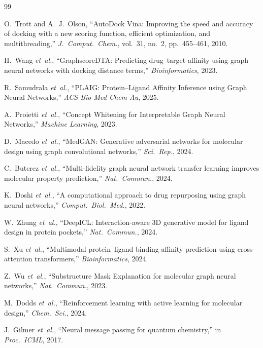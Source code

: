 \documentclass[conference]{IEEEtran}
\begin{document}
\begin{thebibliography}{99}

O.~Trott and A.~J.~Olson,
``AutoDock Vina: Improving the speed and accuracy of docking with a new scoring function, efficient optimization, and multithreading,''
\emph{J.\ Comput.\ Chem.}, vol.~31, no.~2, pp.~455--461, 2010.

H.~Wang \emph{et~al.},
``GraphscoreDTA: Predicting drug--target affinity using graph neural networks with docking distance terms,''
\emph{Bioinformatics}, 2023.

R.~Samudrala \emph{et~al.},
``PLAIG: Protein--Ligand Affinity Inference using Graph Neural Networks,''
\emph{ACS Bio Med Chem Au}, 2025.

A.~Proietti \emph{et~al.},
``Concept Whitening for Interpretable Graph Neural Networks,''
\emph{Machine Learning}, 2023.

D.~Macedo \emph{et~al.},
``MedGAN: Generative adversarial networks for molecular design using graph convolutional networks,''
\emph{Sci.\ Rep.}, 2024.

C.~Buterez \emph{et~al.},
``Multi-fidelity graph neural network transfer learning improves molecular property prediction,''
\emph{Nat.\ Commun.}, 2024.

K.~Doshi \emph{et~al.},
``A computational approach to drug repurposing using graph neural networks,''
\emph{Comput.\ Biol.\ Med.}, 2022.

W.~Zhung \emph{et~al.},
``DeepICL: Interaction-aware 3D generative model for ligand design in protein pockets,''
\emph{Nat.\ Commun.}, 2024.

S.~Xu \emph{et~al.},
``Multimodal protein--ligand binding affinity prediction using cross-attention transformers,''
\emph{Bioinformatics}, 2024.

Z.~Wu \emph{et~al.},
``Substructure Mask Explanation for molecular graph neural networks,''
\emph{Nat.\ Commun.}, 2023.

M.~Dodds \emph{et~al.},
``Reinforcement learning with active learning for molecular design,''
\emph{Chem.\ Sci.}, 2024.

J.~Gilmer \emph{et~al.},
``Neural message passing for quantum chemistry,''
in \emph{Proc.\ ICML}, 2017.


\end{thebibliography}
\end{document}
